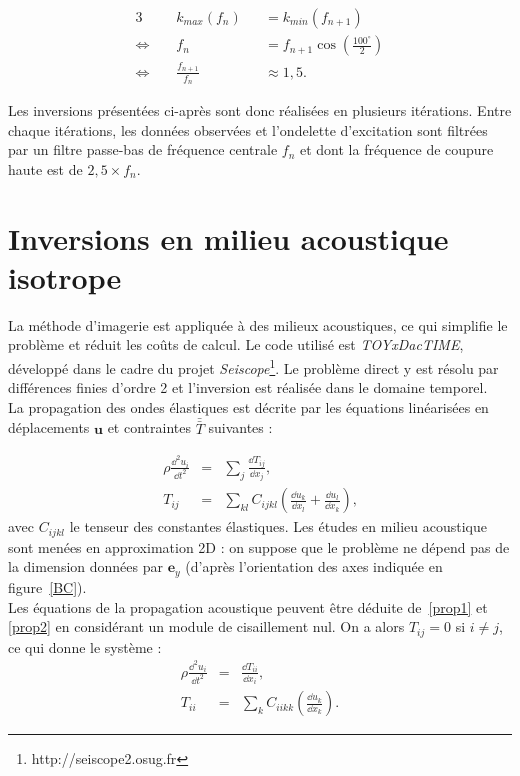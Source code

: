 \begin{alignat*}{3}
	  ~&k_{max}(f_{n}) &&= k_{min}(f_{n+1})\\
	\Leftrightarrow~~~~~ &  f_n &&= f_{n+1}\cos \left(\frac{100^\circ}{2} \right)\\
	 \Leftrightarrow~~~~~ & \frac{f_{n+1}}{f_n} && \approx  1,5.
\end{alignat*} 

Les inversions présentées ci-après sont donc réalisées en plusieurs itérations. Entre chaque itérations, les données observées et l'ondelette d'excitation sont filtrées par un filtre passe-bas de fréquence centrale $f_{n}$ et dont la fréquence de coupure haute est de $2,5 \times f_{n}$.


\section{Inversions en milieu acoustique isotrope}

La méthode d'imagerie est appliquée à des milieux acoustiques, ce qui simplifie le problème et réduit les coûts de calcul. Le code utilisé est \emph{TOYxDacTIME}, développé dans le cadre du projet \emph{Seiscope}\footnote{http://seiscope2.osug.fr}. Le problème direct y est résolu par différences finies d'ordre 2 et l'inversion est réalisée dans le domaine temporel.\\

La propagation des ondes élastiques est décrite par les équations linéarisées en déplacements $\bm{u}$ et contraintes $\bar{\bar T}$ suivantes \citep{mat_ac2} : 

\begin{eqnarray}
	\rho \frac{\dd^2 u_{i}}{\dd t^2} &=& \displaystyle\sum_{j}\frac{\dd T_{ij}}{\dd x_{j}}\text{,}	\label{prop1}\\
	T_{ij}&=&\displaystyle\sum_{kl}C_{ijkl}\left( \frac{\dd u_{k}}{\dd x_{l}} + \frac{\dd u_{l}}{\dd x_{k}}\right)\text{,}	\label{prop2}
\end{eqnarray}
avec $C_{ijkl}$ le tenseur des constantes élastiques. Les études en milieu acoustique sont menées en approximation 2D : on suppose que le problème ne dépend pas de la dimension données par $\bm{e}_{y}$ (d'après l'orientation des axes indiquée en figure~\ref{BC}).\\

Les équations de la propagation acoustique peuvent être déduite de~\ref{prop1} et \ref{prop2} en considérant un module de cisaillement nul. On a alors $T_{ij}=0$ si $i\neq j$, ce qui donne le système :
\begin{eqnarray}
	\rho \frac{\dd^2 u_{i}}{\dd t^2} &=& \frac{\dd T_{ii}}{\dd x_{i}}\text{,}\\
	T_{ii} &=& \displaystyle\sum_{k}C_{iikk}\left( \frac{\dd u_{k}}{\dd x_{k}}\right)	.
\end{eqnarray}


